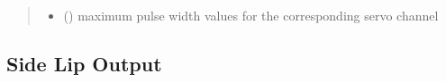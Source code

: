 \documentclass[letterpaper,10pt,english]{sphinxmanual}
\begin{document}
\begin{fulllineitems}
\begin{fulllineitems}
\begin{quote}
\begin{description}
\begin{itemize}
\item {} 
\sphinxAtStartPar
{} (\sphinxstyleliteralemphasis{\sphinxupquote{{[}}}\sphinxstyleliteralemphasis{\sphinxupquote{{]}}}) \textendash{} maximum pulse width values for the corresponding 
servo channel

\end{itemize}

\end{description}\end{quote}

\end{fulllineitems}


\end{fulllineitems}



\subsection{Side Lip Output}
\label{\detokenize{specific:module-SideLipOutput}}\label{\detokenize{specific:side-lip-output}}
\end{document}
